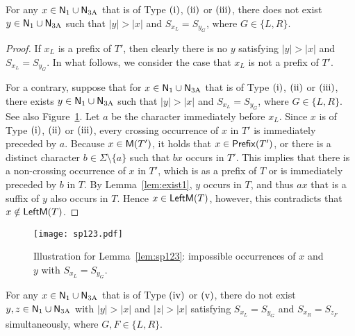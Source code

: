   \begin{lemma} \label{lem:sp123}
    For any $x \in \mathsf{N}_{\mathrm{1}} \cup \mathsf{N}_{\mathrm{3A}}$ that is of Type $\rm{(i)}$, $\rm{(ii)}$ or $\rm{(iii)}$,
    there does not exist $y\in \mathsf{N}_{\mathrm{1}} \cup \mathsf{N}_{\mathrm{3A}}$ such that
    $|y|>|x|$ and $S_{x_L}=S_{{y}_{G}}$,
    where $G \in \{L,R\}$.
  \end{lemma}
  
  \begin{proof}
    If $x_L$ is a prefix of $T'$, then clearly there is no $y$ satisfying
    $|y|>|x|$ and $S_{x_L}=S_{{y}_{G}}$.
    In what follows, we consider the case that $x_L$ is not a prefix of $T'$.
    
    For a contrary, suppose that for $x \in \mathsf{N}_{\mathrm{1}} \cup \mathsf{N}_{\mathrm{3A}}$ that is of Type $\rm{(i)}$, $\rm{(ii)}$ or $\rm{(iii)}$, 
    there exists $y\in \mathsf{N}_{\mathrm{1}} \cup \mathsf{N}_{\mathrm{3A}}$ such that
    $|y|>|x|$ and $S_{x_L}=S_{{y}_{G}}$, where $G \in \{L,R\}$.
    See also Figure~\ref{fig:sp123}.
    Let $a$ be the character immediately before $x_L$.
    Since $x$ is of Type $\rm{(i)}$, $\rm{(ii)}$ or $\rm{(iii)}$,
    every crossing occurrence of $x$ in $T'$ is immediately
    preceded by $a$.
    Because $x \in \mathsf{M}(T')$,
    it holds that $x \in \mathsf{Prefix}(T')$,
    or there is a distinct character $b \in \Sigma \setminus \{a\}$
    such that $bx$ occurs in $T'$.
    This implies that there is a non-crossing occurrence of $x$ in $T'$,
    which is as a prefix of $T$ or is immediately preceded by $b$ in $T$.
    By Lemma~\ref{lem:exist1}, $y$ occurs in $T$, and thus $ax$ that is a suffix of $y$ also occurs in $T$.
    Hence $x \in \mathsf{LeftM}(T)$, however, this contradicts that $x \notin \mathsf{LeftM}(T)$.
  \end{proof}


  \begin{figure}[bth]
    \centering
    \texttt{[image: sp123.pdf]}
    \caption{Illustration for Lemma~\ref{lem:sp123}: impossible occurrences of $x$ and $y$ with $S_{x_L} = S_{y_G}$.}
    \label{fig:sp123}
  \end{figure}

  \begin{lemma} \label{lem:sp45}
    For any $x \in \mathsf{N}_{\mathrm{1}} \cup \mathsf{N}_{\mathrm{3A}}$ that is of Type $\rm{(iv)}$ or $\rm{(v)}$, 
    there do not exist $y,z \in \mathsf{N}_{\mathrm{1}} \cup \mathsf{N}_{\mathrm{3A}}$ with
    $|y|>|x|$ and $|z|>|x|$
    satisfying
    $S_{x_L}=S_{{y}_{G}}$ and $S_{x_R}=S_{{z}_{F}}$ simultaneously,
    where $G,F \in \{L,R\}$.
  \end{lemma}

